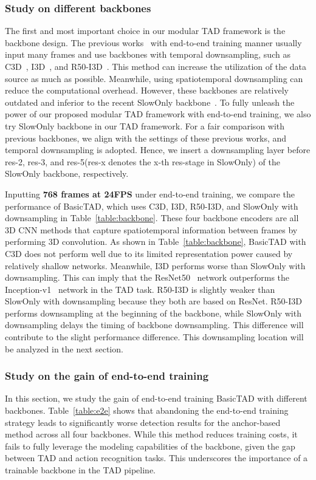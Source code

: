 \documentclass[a4paper,fleqn]{cas-dc}
\begin{document}
\subsubsection{Study on different backbones}
The first and most important choice in our modular TAD framework is the backbone design.
The previous works~\citep{rgb_enough,r-c3d,pbrnet,afsd,sparse-rcnn-tad} with end-to-end training manner usually input many frames and use backbones with  temporal downsampling, such as C3D~\citep{c3d}, I3D~\citep{i3d}, and R50-I3D~\citep{r50-i3d-non-local}.
This method can increase the utilization of the data source as much as possible. Meanwhile, using  spatiotemporal downsampling can reduce the computational overhead. 
However, these backbones are relatively outdated and inferior to the recent SlowOnly backbone~\citep{slowfast}. To fully unleash the power of our proposed modular TAD framework with end-to-end training, we also try SlowOnly backbone in our TAD framework.
For a fair comparison with previous backbones, we align with the settings of these previous works, and  temporal downsampling is adopted. 
Hence, we insert a  downsampling layer before res-2, res-3, and res-5(res-x denotes the x-th res-stage in SlowOnly) of the SlowOnly backbone, respectively. 

Inputting \textbf{768 frames at 24FPS} under end-to-end training, we compare the performance of BasicTAD, which uses C3D, I3D, R50-I3D, and SlowOnly with  downsampling in Table~\ref{table:backbone}.
These four backbone encoders are all 3D CNN methods that capture spatiotemporal information between frames by performing 3D convolution. 
As shown in Table~\ref{table:backbone}, BasicTAD with C3D does not perform well due to its limited representation power caused by relatively shallow networks. 
Meanwhile, I3D performs worse than SlowOnly with  downsampling. This can imply that the ResNet50~\citep{resnet} network outperforms the Inception-v1~\citep{bn-inception} network in the TAD task.
R50-I3D is slightly weaker than SlowOnly with  downsampling because they both are based on ResNet. R50-I3D performs  downsampling at the beginning of the backbone, while SlowOnly with  downsampling delays the timing of backbone downsampling. This difference will contribute to the slight performance difference. This downsampling location will be analyzed in the next section.


\subsubsection{Study on the gain of end-to-end training}
In this section, we study the gain of end-to-end training BasicTAD with different backbones. 
Table~\ref{table:e2e} shows that abandoning the end-to-end training strategy leads to significantly worse detection results for the anchor-based method across all four backbones. 
While this method reduces training costs, it fails to fully leverage the modeling capabilities of the backbone, given the gap between TAD and action recognition tasks.
This underscores the importance of a trainable backbone in the TAD pipeline.
\end{document}
